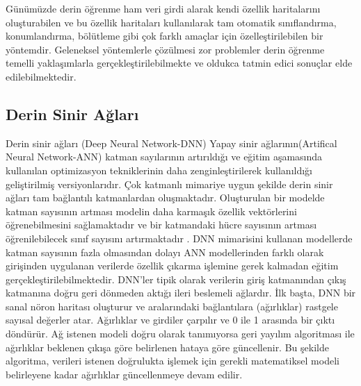 Günümüzde derin öğrenme ham veri girdi alarak kendi özellik haritalarını oluşturabilen ve bu özellik haritaları kullanılarak tam otomatik sınıflandırma, konumlandırma, bölütleme gibi çok farklı amaçlar için özelleştirilebilen bir yöntemdir. Geleneksel yöntemlerle çözülmesi zor problemler derin öğrenme temelli yaklaşımlarla gerçekleştirilebilmekte ve oldukca tatmin edici sonuçlar elde edilebilmektedir.

\subsection{Derin Sinir Ağları}
Derin sinir ağları (Deep Neural Network-DNN) Yapay sinir ağlarının(Artifical Neural Network-ANN) katman sayılarının artırıldığı ve eğitim aşamasında kullanılan optimizasyon tekniklerinin daha zenginleştirilerek kullanıldığı geliştirilmiş versiyonlarıdır. Çok katmanlı mimariye uygun şekilde derin sinir ağları tam bağlantılı katmanlardan oluşmaktadır. Oluşturulan bir modelde katman sayısının artması modelin daha karmaşık özellik vektörlerini öğrenebilmesini sağlamaktadır ve bir katmandaki hücre sayısının artması öğrenilebilecek sınıf sayısını artırmaktadır \cite{bengio2009learning,schmidhuber2015deep}. DNN mimarisini kullanan modellerde katman sayısının fazla olmasından dolayı ANN modellerinden farklı olarak girişinden uygulanan verilerde özellik çıkarma işlemine gerek kalmadan eğitim gerçekleştirilebilmektedir. DNN'ler tipik olarak verilerin giriş katmanından çıkış katmanına doğru geri dönmeden aktığı ileri beslemeli ağlardır. İlk başta, DNN bir sanal nöron haritası oluşturur ve aralarındaki bağlantılara (ağırlıklar) rastgele sayısal değerler atar. Ağırlıklar ve girdiler çarpılır ve 0 ile 1 arasında bir çıktı döndürür. Ağ istenen modeli doğru olarak tanımıyorsa geri yayılım algoritması ile ağırlıklar beklenen çıkışa göre belirlenen hataya göre güncellenir. Bu şekilde algoritma, verileri istenen doğrulukta işlemek için gerekli matematiksel modeli belirleyene kadar ağırlıklar güncellenmeye devam edilir.

